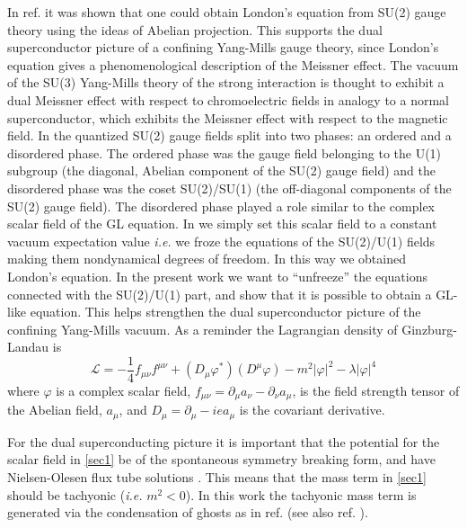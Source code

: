 \documentclass[a4paper,aps,showpacs]{revtex4}
\begin{document}
In ref. \cite{dzhsin02a} it was shown that one could obtain
London's equation from SU(2) gauge theory using the ideas of
Abelian projection. This supports
the dual superconductor picture of a confining Yang-Mills gauge
theory, since London's equation gives a phenomenological 
description of the Meissner effect. The vacuum of the SU(3) Yang-Mills
theory of the strong interaction
is thought to exhibit a dual Meissner effect with respect to
chromoelectric fields in analogy to a normal superconductor, which 
exhibits the Meissner effect with respect to the magnetic field.
In \cite{dzhsin02a} the quantized SU(2) gauge fields split into two phases: 
an ordered and  a disordered phase. The ordered phase was the gauge field 
belonging to  the U(1) subgroup (the diagonal,  Abelian component of 
the SU(2) gauge field) and the disordered phase was the coset SU(2)/SU(1) 
(the off-diagonal components of the SU(2) gauge field). The disordered phase
played a role similar to the complex scalar field of the GL 
equation. In \cite{dzhsin02a} we simply set this scalar field to a constant 
vacuum expectation value {\it i.e.} we froze the equations of the SU(2)/U(1)
fields making them nondynamical degrees of freedom. In this way we obtained
London's equation. In the present work we want to ``unfreeze'' the
equations connected with the SU(2)/U(1) part, and show that it is possible
to obtain a GL-like equation. This
helps strengthen the dual superconductor picture of the confining 
Yang-Mills vacuum. As a reminder the Lagrangian density of
Ginzburg-Landau is
\begin{equation}
\label{sec1}
{\mathcal L} = - \frac{1}{4}f_{\mu \nu} f^{\mu \nu} + 
   \left( D_\mu \varphi^* \right) \left( D^\mu \varphi \right) - 
   m^2 \left| \varphi \right|^2  - \lambda \left| \varphi \right|^4 
\end{equation}
where $\varphi$ is a complex scalar field, $f_{\mu \nu} =\partial _{\mu}
a_{\nu} -\partial _{\nu} a_{\mu}$, is the field strength tensor of the Abelian
field, $a_{\mu}$, and $D_{\mu} = \partial _{\mu} -i e a_{\mu}$ is the
covariant derivative. 

For the dual superconducting picture it is important that the potential
for the scalar field in \eqref{sec1} be of the spontaneous symmetry breaking
form, and have Nielsen-Olesen flux tube solutions \cite{no}. 
This means that the mass term in \eqref{sec1} should 
be tachyonic ({\it i.e.} $m^2 <0$). In this work the tachyonic mass term 
is generated via the condensation of ghosts as in ref. \cite{dudal} (see
also ref. \cite{lemes}). 
\end{document}
